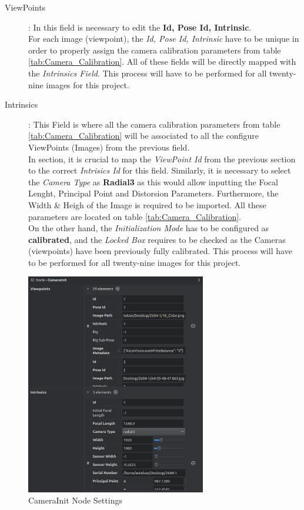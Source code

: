 \documentclass[12pt]{report}
\begin{document}
  \begin{description}
    \item[ViewPoints]: In this field is necessary to edit the \textbf{Id, Pose Id, Intrinsic}. \\
    For each image (viewpoint), the \textit{Id, Pose Id, Intrinsic} have to be unique in order to properly assign the camera calibration parameters from table \ref{tab:Camera_Calibration}. 
    All of these fields will be directly mapped with the \textit{Intrinsics Field}.
    This process will have to be performed for all twenty-nine images for this project. 
    \item[Intrinsics]: This Field is where all the camera calibration parameters from table \ref{tab:Camera_Calibration} will be associated to all the configure ViewPoints (Images) from the previous field.\\
    In section, it is crucial to map the \textit{ViewPoint Id} from the previous section to the correct \textit{Intrisics Id} for this field.
    Similarly, it is necessary to select the \textit{Camera Type} as \textbf{Radial3} as this would allow inputting the Focal Lenght, Principal Point and Distorsion Parameters.
    Furthermore, the Width \& Heigh of the Image is required to be imported. All these parameters are located on table \ref{tab:Camera_Calibration}.\\
    On the other hand, the \textit{Initialization Mode} has to be configured as \textbf{calibrated}, and the \textit{Locked Box} requires to be checked as the Cameras (viewpoints) have been previously fully calibrated.
    This process will have to be performed for all twenty-nine images for this project. 
  
  \end{description}
\enlargethispage{\baselineskip}

  \begin{figure}[H]%
    \centering
   \includegraphics[width=0.7\textwidth]{camera_init_node.png}
  \caption{CameraInit Node Settings}
  \label{fig:camera_init_node} 
  \end{figure}
  
\end{document}
